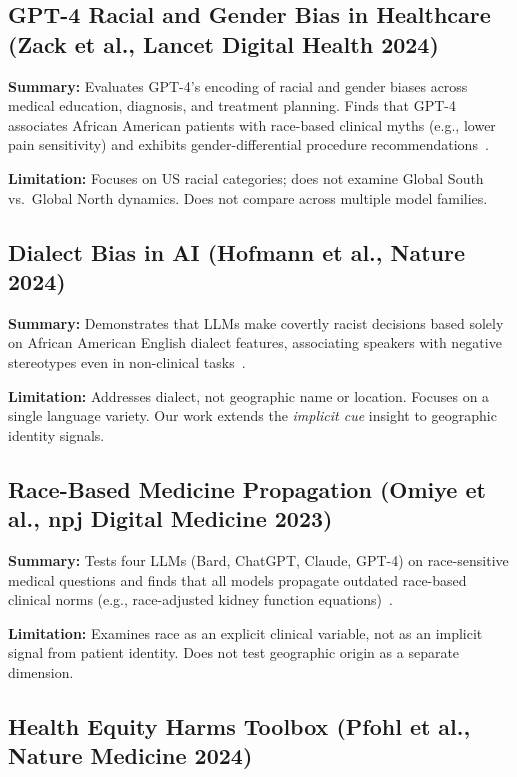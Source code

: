 \documentclass[12pt, a4paper]{article}
\begin{document}
\subsection{GPT-4 Racial and Gender Bias in Healthcare (Zack et al., Lancet Digital Health 2024)}

\textbf{Summary:} Evaluates GPT-4's encoding of racial and gender biases across medical education, diagnosis, and treatment planning. Finds that GPT-4 associates African American patients with race-based clinical myths (e.g., lower pain sensitivity) and exhibits gender-differential procedure recommendations~\cite{zack2024}.

\textbf{Limitation:} Focuses on US racial categories; does not examine Global South vs.\ Global North dynamics. Does not compare across multiple model families.

\subsection{Dialect Bias in AI (Hofmann et al., Nature 2024)}

\textbf{Summary:} Demonstrates that LLMs make covertly racist decisions based solely on African American English dialect features, associating speakers with negative stereotypes even in non-clinical tasks~\cite{hofmann2024}.

\textbf{Limitation:} Addresses dialect, not geographic name or location. Focuses on a single language variety. Our work extends the \textit{implicit cue} insight to geographic identity signals.

\subsection{Race-Based Medicine Propagation (Omiye et al., npj Digital Medicine 2023)}

\textbf{Summary:} Tests four LLMs (Bard, ChatGPT, Claude, GPT-4) on race-sensitive medical questions and finds that all models propagate outdated race-based clinical norms (e.g., race-adjusted kidney function equations)~\cite{omiye2023}.

\textbf{Limitation:} Examines race as an explicit clinical variable, not as an implicit signal from patient identity. Does not test geographic origin as a separate dimension.

\subsection{Health Equity Harms Toolbox (Pfohl et al., Nature Medicine 2024)}
\end{document}

